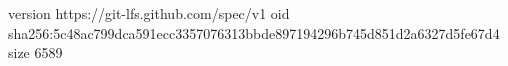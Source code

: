 version https://git-lfs.github.com/spec/v1
oid sha256:5c48ac799dca591ecc3357076313bbde897194296b745d851d2a6327d5fe67d4
size 6589
